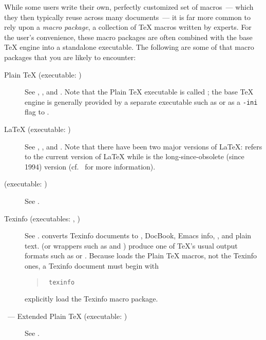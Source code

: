 While some users write their own, perfectly customized set of
macros~--- which they then typically reuse across many documents~--- it is
far more common to rely upon a \emph{macro package}, a collection of
\TeX{} macros written by experts.  For the user's convenience, these
macro packages are often combined with the base \TeX{} engine into a
standalone executable.  The following are some of that macro packages
that you are likely to encounter:
\begin{description}
  \item[Plain \TeX{} (executable: )]
  See
  ,
  ,
   and
  .
  Note that the Plain \TeX{} executable is called ; the
  base \TeX{} engine is generally provided by a separate executable
  such as  or as a \texttt{-ini} flag to
  .

  \item[\LaTeX{} (executable: )]
  See
  ,
  ,
   and
  .
  Note that there have been two major versions of \LaTeX{}: \LaTeXe{}
  refers to the current version of \LaTeX{} while \LaTeXo{} is the
  long-since-obsolete (since 1994) version (cf.~%
   for more information).

  \item[\CONTeXT{} (executable: )]
  See
  .

  \item[Texinfo (executables: , )]
  See
  .  
  converts Texinfo documents to , DocBook, Emacs info,
  , and plain text.   (or wrappers such as
   and ) produce one of \TeX{}'s
  usual output formats such as  or .  Because
   loads the Plain \TeX{} macros, not the Texinfo ones,
  a Texinfo document must begin with
  \begin{quote}
    \texttt{ texinfo}
  \end{quote}
  explicitly load the Texinfo macro package.

  \item[\Eplain{}~--- Extended Plain \TeX{} (executable: )]
  See
  .
\end{description}

